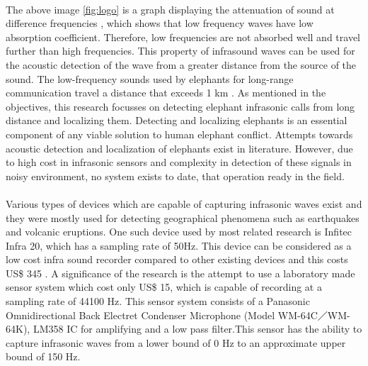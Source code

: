 \documentclass[11pt]{article}
\numberwithin{figure}{section}
\numberwithin{table}{section}
\begin{document}
\paragraph{}
The above image \ref{fig:logo} is a graph displaying the attenuation of sound at difference frequencies \cite {5}, which shows that low frequency waves have low absorption coefficient. Therefore, low frequencies are not absorbed well and travel further than high frequencies. This property of infrasound waves can be used  for the acoustic detection of the wave from a greater distance from the source of the sound. The low-frequency sounds used by elephants for long-range communication travel a distance that exceeds 1 km \cite {3}. As mentioned in the objectives, this research focusses on detecting elephant infrasonic calls from long distance and localizing them. Detecting and localizing elephants is an essential component of any viable solution to human elephant conflict. Attempts towards acoustic detection and localization of elephants exist in literature. However, due to high cost in infrasonic sensors and complexity in detection of these signals  in noisy environment, no system exists to date, that operation ready in the field.

\paragraph{}
Various types of devices which are capable of capturing infrasonic waves exist and they were mostly used for detecting geographical phenomena such as earthquakes and volcanic eruptions. One such device used by most related research is Infitec Infra 20, which has a sampling rate of 50Hz. This device can be considered as a low cost infra sound recorder compared to other existing devices and this costs US\$ 345 \cite {7}. A significance of the research is the attempt to use a laboratory made sensor system which cost only US\$ 15, which is capable of recording at a sampling rate of 44100 Hz. This sensor system consists of a Panasonic Omnidirectional Back Electret Condenser Microphone \cite{15} (Model WM-64C／WM-64K), LM358 IC for amplifying and a low pass filter\cite{16}.This sensor has the ability to capture infrasonic waves from a lower bound of 0 Hz to an approximate upper bound of 150 Hz.
\end{document}
